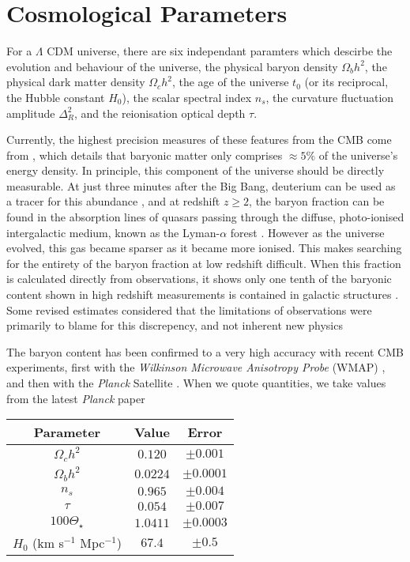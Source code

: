 \section{Cosmological Parameters}
For a $\Lambda$ CDM universe, there are six independant paramters which descirbe the evolution and behaviour of the universe, the physical baryon density $\Omega_b h^2$, the physical dark matter density $\Omega_c h^2$, the age of the universe $t_0$ (or its reciprocal, the Hubble constant $H_0$), the scalar spectral index $n_s$, the curvature fluctuation amplitude $\Delta_R^2$, and the reionisation optical depth $\tau$. 

Currently, the highest precision measures of these features from the CMB come from \cite{2018arXiv180706209P}, which details that baryonic matter only comprises $\approx 5 \% $ of the universe's energy density. In principle, this component of the universe should be directly measurable. At just three minutes after the Big Bang, deuterium can be used as a tracer for this abundance \citep{2007ARNPS..57..463S}, and at redshift $z \geqslant 2$, the baryon fraction can be found in the absorption lines of quasars passing through the diffuse, photo-ionised intergalactic medium, known as the Lyman-$\alpha$ forest \citep{1997ApJ...490..564W}. However as the universe evolved, this gas became sparser as it became more ionised. This makes searching for the entirety of the baryon fraction at low redshift difficult. When this fraction is calculated directly from observations, it shows only one tenth of the baryonic content shown in high redshift measurements is contained in galactic structures \citep{1992MNRAS.258P..14P}. Some revised estimates considered that the limitations of observations were primarily to blame for this discrepency, and not inherent new physics \citep{1994MNRAS.267...13B, 1998ApJ...503..518F}

The baryon content has been confirmed to a very high accuracy with recent CMB experiments, first with the \textit{Wilkinson Microwave Anisotropy Probe} (WMAP) \citep{2007ApJS..170..377S}, and then with the \textit{Planck} Satellite \citep{2018arXiv180706209P}. When we quote quantities, we take values from the latest \textit{Planck} paper


\begin{center}\label{table:params}
 \begin{tabular}{||c c c||} 
 \hline
 Parameter & Value & Error \\
 \hline\hline
 $\Omega_c h^2$ & $0.120$ & $\pm 0.001$ \\
 \hline
 $\Omega_b h^2$ & $0.0224$ & $\pm 0.0001$ \\
 \hline
  $n_s$ & $0.965$ & $\pm 0.004$ \\
 \hline
  $\tau$  & $0.054$ & $\pm 0.007$ \\
 \hline
  $100 \Theta_\star$ & $1.0411$ & $\pm 0.0003$ \\
 \hline
 $H_0$ (km s$^{-1}$ Mpc$^{-1}$) & $67.4$ & $\pm 0.5$ \\
 \hline
\end{tabular}
\end{center}



